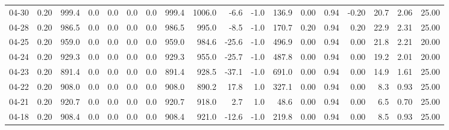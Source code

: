 \begin{threeparttable}
{\begin{tabular}{lrrrrrrrrrrrrrrrrr}
  04-30 &     0.20 &  999.4 &               0.0 &               0.0 &                0.0 &                0.0 &  999.4 & 1006.0 &       -6.6 &                     -1.0 &               136.9 &       0.00 &      0.94 &          -0.20 &             20.7 &            2.06 &                  25.00 \\
  04-28 &     0.20 &  986.5 &               0.0 &               0.0 &                0.0 &                0.0 &  986.5 &  995.0 &       -8.5 &                     -1.0 &               170.7 &       0.20 &      0.94 &           0.20 &             22.9 &            2.31 &                  25.00 \\
  04-25 &     0.20 &  959.0 &               0.0 &               0.0 &                0.0 &                0.0 &  959.0 &  984.6 &      -25.6 &                     -1.0 &               496.9 &       0.00 &      0.94 &           0.00 &             21.8 &            2.21 &                  20.00 \\
  04-24 &     0.20 &  929.3 &               0.0 &               0.0 &                0.0 &                0.0 &  929.3 &  955.0 &      -25.7 &                     -1.0 &               487.8 &       0.00 &      0.94 &           0.00 &             19.2 &            2.01 &                  20.00 \\
  04-23 &     0.20 &  891.4 &               0.0 &               0.0 &                0.0 &                0.0 &  891.4 &  928.5 &      -37.1 &                     -1.0 &               691.0 &       0.00 &      0.94 &           0.00 &             14.9 &            1.61 &                  25.00 \\
  04-22 &     0.20 &  908.0 &               0.0 &               0.0 &                0.0 &                0.0 &  908.0 &  890.2 &       17.8 &                      1.0 &               327.1 &       0.00 &      0.94 &           0.00 &              8.3 &            0.93 &                  25.00 \\
  04-21 &     0.20 &  920.7 &               0.0 &               0.0 &                0.0 &                0.0 &  920.7 &  918.0 &        2.7 &                      1.0 &                48.6 &       0.00 &      0.94 &           0.00 &              6.5 &            0.70 &                  25.00 \\
  04-18 &     0.20 &  908.4 &               0.0 &               0.0 &                0.0 &                0.0 &  908.4 &  921.0 &      -12.6 &                     -1.0 &               219.8 &       0.00 &      0.94 &           0.00 &              8.5 &            0.93 &                  25.00 \\

\end{tabular}}
\end{threeparttable}
